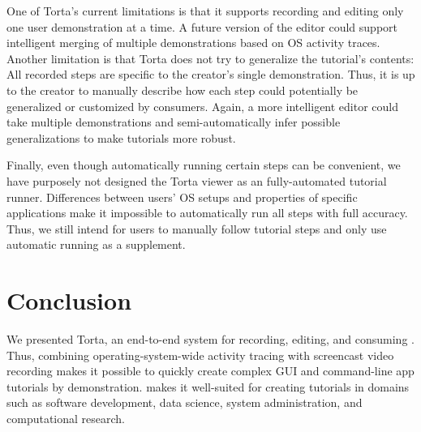 One of Torta's current limitations is that it supports recording and
editing only one user demonstration at a time. A future version of the
editor could support intelligent merging of multiple demonstrations
based on OS activity traces. Another limitation is that Torta does not
try to generalize the tutorial's contents: All recorded steps are
specific to the creator's single demonstration. Thus, it is up to the
creator to manually describe how each step could potentially be
generalized or customized by consumers. Again, a more intelligent editor
could take multiple demonstrations and semi-automatically infer possible
generalizations to make tutorials more robust.

Finally, even though automatically running certain steps can be
convenient, we have purposely not designed the Torta viewer as an
fully-automated tutorial runner. Differences between users' OS
setups and properties of specific applications make it impossible to
automatically run all steps with full accuracy.
Thus,
we still intend for users to manually follow tutorial steps and
only use automatic running as a supplement.


\section{Conclusion}

We presented Torta, an end-to-end system for recording, editing, and
consuming . Thus, combining operating-system-wide activity tracing with
screencast video recording makes it possible to quickly create complex
GUI and command-line app tutorials by demonstration.  makes it well-suited for creating
tutorials in domains such as software development, data science, system
administration, and computational research.
%

